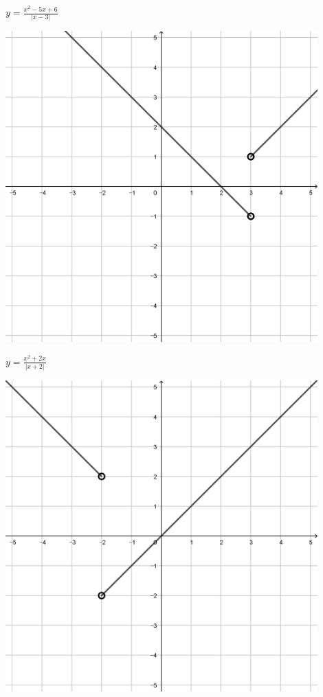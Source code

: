 \documentclass[a4paper]{oblivoir}
\begin{document}
\begin{minipage}{0.45\textwidth}\centering
\(y=\frac{x^2-5x+6}{|x-3|}\)
\par\bigskip\includegraphics[width=0.9\textwidth]{img/17-5}
\end{minipage}
\begin{minipage}{0.45\textwidth}\centering
\(y=\frac{x^2+2x}{|x+2|}\)
\par\bigskip\includegraphics[width=0.9\textwidth]{img/17-6}
\end{minipage}\bigskip\bigskip\par
\end{document}
